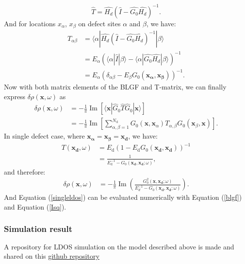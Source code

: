 \begin{equation}
	\hat{T} = \hat{H_d} (\hat{I} - \hat{G_0}\hat{H_d})^{-1}.
\end{equation} 
And for locations $x_\alpha$, $x_\beta$ on defect sites $\alpha$ and $\beta$, we have: 
\begin{align}
	T_{\alpha\beta} &= \langle \alpha|\hat{H_d} (\hat{I} - \hat{G_0}\hat{H_d})^{-1} | \beta\rangle \\
	&= E_\alpha(\langle \alpha|\hat{I}|\beta\rangle - \langle \alpha|\hat{G_0}\hat{H_d}|\beta \rangle)^{-1} \\
	&= E_\alpha(\delta_{\alpha \beta} - E_\beta G_0(\mathbf{x_\alpha},\mathbf{x_\beta}))^{-1} \label{T_matrix_ele}.
\end{align}
Now with both matrix elements of the \ac{BLGF} and T-matrix, we can finally express $\delta\rho(\mathbf{x},\omega)$ as 
\begin{align}
	\delta\rho(\mathbf{x},\omega) &= - \frac{1}{\pi} \operatorname{Im} \left[ \langle \mathbf{x} | \hat{G}_0 \hat{T} \hat{G}_0 | \mathbf{x} \rangle \right] \\
	&= -\frac{1}{\pi} \operatorname{Im} \left[\sum_{\alpha, \beta=1}^{N_{\text{d}}} G_0(\mathbf{x}, \mathbf{x}_\alpha) T_{\alpha, \beta} G_0(\mathbf{x}_\beta, \mathbf{x})\right]. \label{multi_defect_eq}
\end{align}
In single defect case, where $\mathbf{x_\alpha} = \mathbf{x_\beta} = \mathbf{x_d}$, we have: 
\begin{align}
	T(\mathbf{x_d},\omega) &= E_{\text{d}} \left( 1 - E_{\text{d}} G_0(\mathbf{x_d}, \mathbf{x_d}) \right)^{-1} \label{T_matrix_ele} \\
	&= \frac{1}{E_{\text{d}}^{-1} - G_0(\mathbf{x_d}, \mathbf{x_d}; \omega)},
\end{align}
and therefore: 
\begin{align}
	\delta\rho(\mathbf{x},\omega) &= - \frac{1}{\pi} \operatorname{Im}(\frac{G_0^2(\mathbf{x},\mathbf{x_d};\omega)}{E_d^{-1} - G_0(\mathbf{x_d},\mathbf{x_d};\omega)}) \label{singleldos}. 
\end{align}
And Equation (\ref{singleldos}) can be evaluated numerically with Equation (\ref{blgf}) and Equation (\ref{Isq}).

\subsubsection{Simulation result}
A repository for \ac{LDOS} simulation on the model described above is made and shared on this \hyperlink{https://github.com/Plswearpants/QPI_simulation}{github repository}

